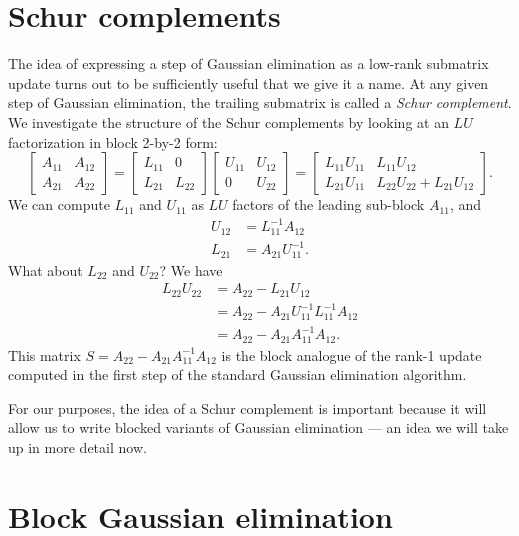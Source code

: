 \documentclass[12pt, leqno]{article}
\begin{document}
\section{Schur complements}

The idea of expressing a step of Gaussian elimination as a low-rank
submatrix update turns out to be sufficiently useful that we give it
a name.  At any given step of Gaussian elimination, the trailing
submatrix is called a {\em Schur complement}.  We investigate the
structure of the Schur complements by looking at an $LU$
factorization in block 2-by-2 form:
\[
  \begin{bmatrix}
    A_{11} & A_{12} \\
    A_{21} & A_{22}
  \end{bmatrix} =
  \begin{bmatrix}
    L_{11} & 0 \\
    L_{21} & L_{22}
  \end{bmatrix}
  \begin{bmatrix}
    U_{11} & U_{12} \\
        0 & U_{22}
  \end{bmatrix} =
  \begin{bmatrix}
    L_{11} U_{11} & L_{11} U_{12} \\
    L_{21} U_{11} & L_{22} U_{22} + L_{21} U_{12}
  \end{bmatrix}.
\]
We can compute $L_{11}$ and $U_{11}$ as $LU$ factors of the leading
sub-block $A_{11}$, and
\begin{align*}
  U_{12} &= L_{11}^{-1} A_{12} \\
  L_{21} &= A_{21} U_{11}^{-1}.
\end{align*}
What about $L_{22}$ and $U_{22}$?  We have
\begin{align*}
  L_{22} U_{22}
  &= A_{22} - L_{21} U_{12} \\
  &= A_{22} - A_{21} U_{11}^{-1} L_{11}^{-1} A_{12} \\
  &= A_{22} - A_{21} A_{11}^{-1} A_{12}.
\end{align*}
This matrix $S = A_{22} - A_{21} A_{11}^{-1} A_{12}$ is the block analogue
of the rank-1 update computed in the first step of the standard
Gaussian elimination algorithm.

For our purposes, the idea of a Schur complement is important because
it will allow us to write blocked variants of Gaussian elimination ---
an idea we will take up in more detail now.


\section{Block Gaussian elimination}
\end{document}
